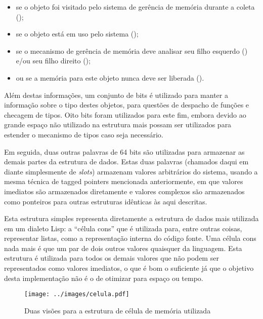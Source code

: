\begin{itemize}

\item se o objeto foi visitado pelo sistema de gerência de memória durante a
coleta ();

\item  se o objeto está em uso pelo sistema ();

\item  se o mecanismo de gerência de memória deve analisar seu filho esquerdo
() e/ou seu filho direito
();

\item  ou se a memória para este objeto nunca deve ser liberada
().

\end{itemize}

Além destas informações, um conjunto de bits é utilizado para manter a
informação sobre o tipo destes objetos, para questões de despacho de funções e
checagem de tipos. Oito bits foram utilizados para este fim, embora devido ao
grande espaço não utilizado na estrutura mais possam ser utilizados para
estender o mecanismo de tipos caso seja necessário.

Em seguida, duas outras palavras de 64 bits são utilizadas para armazenar as
demais partes da estrutura de dados. Estas duas palavras (chamados daqui em diante
simplesmente de  \textit{slots}) armazenam valores arbitrários do sistema, usando a mesma técnica
de tagged pointers mencionada anteriormente, em que valores imediatos são
armazenados diretamente e valores complexos são armazenados como ponteiros para
outras estruturas idênticas às aqui descritas. 

Esta estrutura simples representa diretamente a estrutura de dados mais
utilizada em um dialeto Lisp: a ``célula cons'' que é utilizada para, entre
outras coisas, representar listas, como a representação interna do código
fonte. Uma célula cons nada mais é que um par de dois outros valores quaisquer
da linguagem. Esta estrutura é utilizada para todos os demais valores que não
podem ser representados como valores imediatos, o que é bom o suficiente já que
o objetivo desta implementação não é o de otimizar para espaço ou tempo.

\begin{figure}[h!]
\centering
\texttt{[image: ../images/celula.pdf]}
\caption{Duas visões para a estrutura de célula de memória utilizada}
\label{fig:celula}
\end{figure}

